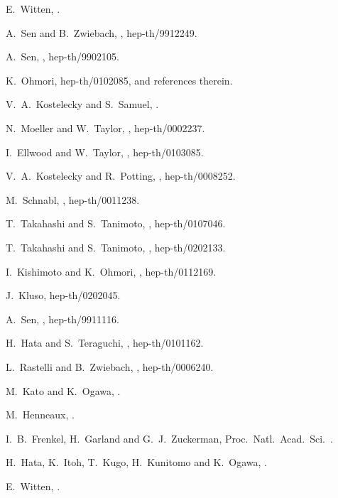 \documentclass[a4paper,seceq,preprint]{ptptex}
\begin{document}
%

\begin{thebibliography}{99}
E.~Witten,
.

A.~Sen and B.~Zwiebach,
, hep-th/9912249.

A.~Sen,
, hep-th/9902105.

K.~Ohmori,
hep-th/0102085,
and references therein.

V.~A.~Kostelecky and S.~Samuel,
.

N.~Moeller and W.~Taylor,
, hep-th/0002237.

I.~Ellwood and W.~Taylor,
, hep-th/0103085.

V.~A.~Kostelecky and R.~Potting,
, hep-th/0008252.

M.~Schnabl,
, hep-th/0011238.

T.~Takahashi and S.~Tanimoto,
, hep-th/0107046.

T.~Takahashi and S.~Tanimoto,
, hep-th/0202133.

I.~Kishimoto and K.~Ohmori,
, hep-th/0112169.

J.~Kluso\coordHE{},
hep-th/0202045.

A.~Sen,
, hep-th/9911116.

H.~Hata and S.~Teraguchi,
, hep-th/0101162.

L.~Rastelli and B.~Zwiebach,
, hep-th/0006240.

M.~Kato and K.~Ogawa,
.

M.~Henneaux,
.

I.~B.~Frenkel, H.~Garland and G.~J.~Zuckerman,
Proc.~Natl.~Acad.~Sci.\ .

H.~Hata, K.~Itoh, T.~Kugo, H.~Kunitomo and K.~Ogawa,
.

E.~Witten,
.


\end{thebibliography}
\end{document}
